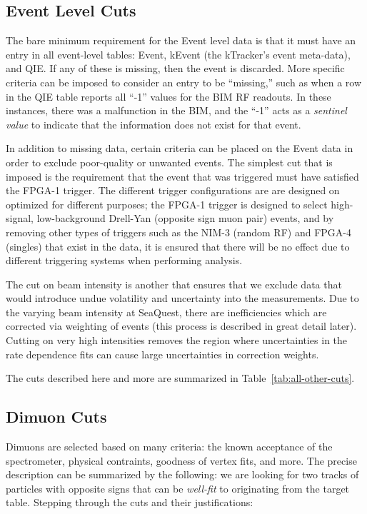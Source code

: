 \subsection{Event Level Cuts}

The bare minimum requirement for the Event level data is that it must have an entry in all event-level tables: Event, kEvent (the kTracker's event meta-data), and QIE. If any of these is missing, then the event is discarded. More specific criteria can be imposed to consider an entry to be ``missing,'' such as when a row in the QIE table reports all ``-1'' values for the BIM RF readouts. In these instances, there was a malfunction in the BIM, and the ``-1'' acts as a \emph{sentinel value} to indicate that the information does not exist for that event.

In addition to missing data, certain criteria can be placed on the Event data in order to exclude poor-quality or unwanted events. The simplest cut that is imposed is the requirement that the event that was triggered must have satisfied the FPGA-1 trigger. The different trigger configurations are are designed on optimized for different purposes; the FPGA-1 trigger is designed to select high-signal, low-background Drell-Yan (opposite sign muon pair) events, and by removing other types of triggers such as the NIM-3 (random RF) and FPGA-4 (singles) that exist in the data, it is ensured that there will be no effect due to different triggering systems when performing analysis.

The cut on beam intensity is another that ensures that we exclude data that would introduce undue volatility and uncertainty into the measurements. Due to the varying beam intensity at SeaQuest, there are inefficiencies which are corrected via weighting of events (this process is described in great detail later). Cutting on very high intensities removes the region where uncertainties in the rate dependence fits can cause large uncertainties in correction weights. 

The cuts described here and more are summarized in Table~\ref{tab:all-other-cuts}.

\subsection{Dimuon Cuts}

Dimuons are selected based on many criteria: the known acceptance of the spectrometer, physical contraints, goodness of vertex fits, and more. The precise description can be summarized by the following: we are looking for two tracks of particles with opposite signs that can be \emph{well-fit} to originating from the target table. Stepping through the cuts and their justifications:

